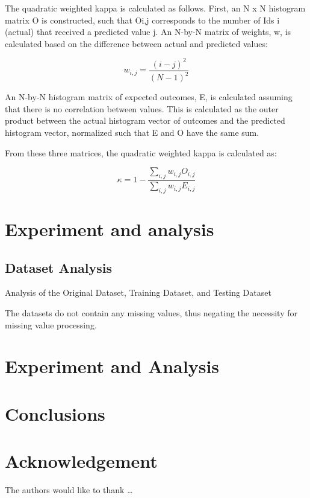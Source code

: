 The quadratic weighted kappa is calculated as follows. First, an N x N histogram matrix O is constructed, such that Oi,j corresponds to the number of Ids i (actual) that received a predicted value j. An N-by-N matrix of weights, w, is calculated based on the difference between actual and predicted values:

\[ w_{i,j} = \frac{(i - j)^2}{(N - 1)^2} \]

An N-by-N histogram matrix of expected outcomes, E, is calculated assuming that there is no correlation between values.  This is calculated as the outer product between the actual histogram vector of outcomes and the predicted histogram vector, normalized such that E and O have the same sum.

From these three matrices, the quadratic weighted kappa is calculated as: 

\[ \kappa = 1 - \frac{\sum_{i,j} w_{i,j} O_{i,j}}{\sum_{i,j} w_{i,j} E_{i,j}} \]

\section{Experiment and analysis}
\subsection{Dataset Analysis}\phantom{...}

Analysis of the Original Dataset, Training Dataset, and Testing Dataset

The datasets do not contain any missing values, thus negating the necessity for missing value processing.






\section{Experiment and Analysis} 



\section{Conclusions} 



\section*{Acknowledgement}


The authors would like to thank \ldots

